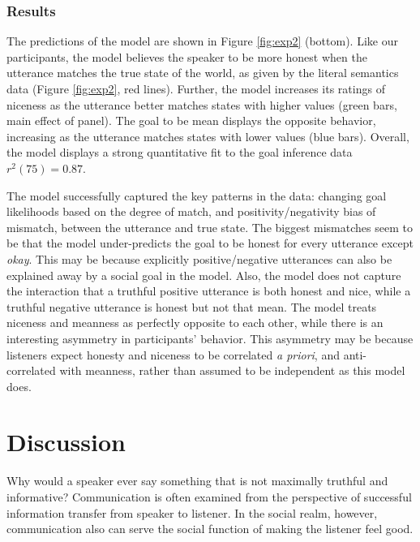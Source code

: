 \documentclass[10pt,letterpaper]{article}
\begin{document}

\subsubsection{Results}
The predictions of the model are shown in Figure \ref{fig:exp2} (bottom).
Like our participants, the model believes the speaker to be more honest when the utterance matches the true state of the world, as given by the literal semantics data (Figure \ref{fig:exp2}, red lines).
Further, the model increases its ratings of niceness as the utterance better matches states with higher values (green bars, main effect of panel).
The goal to be mean displays the opposite behavior, increasing as the utterance matches states with lower values (blue bars).
Overall, the model displays a strong quantitative fit to the goal inference data $r^2(75) = 0.87$.

The model successfully captured the key patterns in the data:
changing goal likelihoods based on the degree of match, and positivity/negativity bias of mismatch, between the utterance and true state.
The biggest mismatches seem to be that the model under-predicts the goal to be honest for every utterance except \emph{okay}.
This may be because explicitly positive/negative utterances can also be explained away by a social goal in the model.
Also, the model does not capture the interaction that a truthful positive utterance is both honest and nice, while a truthful negative utterance is honest but not that mean.
 The model treats niceness and meanness as perfectly opposite to each other, while there is an interesting asymmetry in participants' behavior. 
This asymmetry may be because listeners expect honesty and niceness to be correlated \emph{a priori}, and anti-correlated with meanness, rather than assumed to be independent as this model does.  

\section{Discussion}

Why would a speaker ever say something that is not maximally truthful and informative?
Communication is often examined from the perspective of successful information transfer from speaker to listener.
In the social realm, however, communication also can serve the social function of making the listener feel good.
\end{document}
